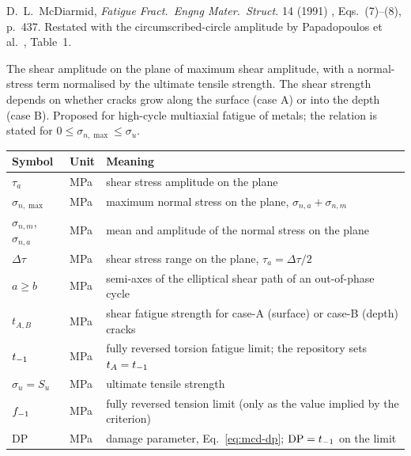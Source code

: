 \label{sheet:MCD}

 D.~L.~McDiarmid, \emph{Fatigue Fract.\ Engng Mater.\ Struct.} 14 (1991)
\cite{mcdiarmid1991}, Eqs.~(7)--(8), p.~437. Restated with the circumscribed-circle amplitude by
Papadopoulos et al.\ \cite{papadopoulos1997}, Table~1.

 The shear amplitude on the plane of maximum shear amplitude, with a
normal-stress term normalised by the ultimate tensile strength. The shear strength depends on whether
cracks grow along the surface (case A) or into the depth (case B). Proposed for high-cycle
multiaxial fatigue of metals; the relation is stated for $0\le\sigma_{n,\max}\le\sigma_u$.

\begin{center}\small
\begin{tabular}{@{}llp{100mm}@{}}
\toprule
Symbol & Unit & Meaning\\\midrule
$\tau_a$ & MPa & shear stress amplitude on the plane\\
$\sigma_{n,\max}$ & MPa & maximum normal stress on the plane, $\sigma_{n,a}+\sigma_{n,m}$\\
$\sigma_{n,m}$, $\sigma_{n,a}$ & MPa & mean and amplitude of the normal stress on the plane\\
$\Delta\tau$ & MPa & shear stress range on the plane, $\tau_a=\Delta\tau/2$\\
$a\ge b$ & MPa & semi-axes of the elliptical shear path of an out-of-phase cycle\\
$t_{A,B}$ & MPa & shear fatigue strength for case-A (surface) or case-B (depth) cracks\\
$t_{-1}$ & MPa & fully reversed torsion fatigue limit; the repository sets $t_A=t_{-1}$\\
$\sigma_u=S_u$ & MPa & ultimate tensile strength\\
$f_{-1}$ & MPa & fully reversed tension limit (only as the value implied by the criterion)\\
$\mathrm{DP}$ & MPa & damage parameter, Eq.~\eqref{eq:mcd-dp}; $\mathrm{DP}=t_{-1}$ on the limit\\
\bottomrule
\end{tabular}
\end{center}

